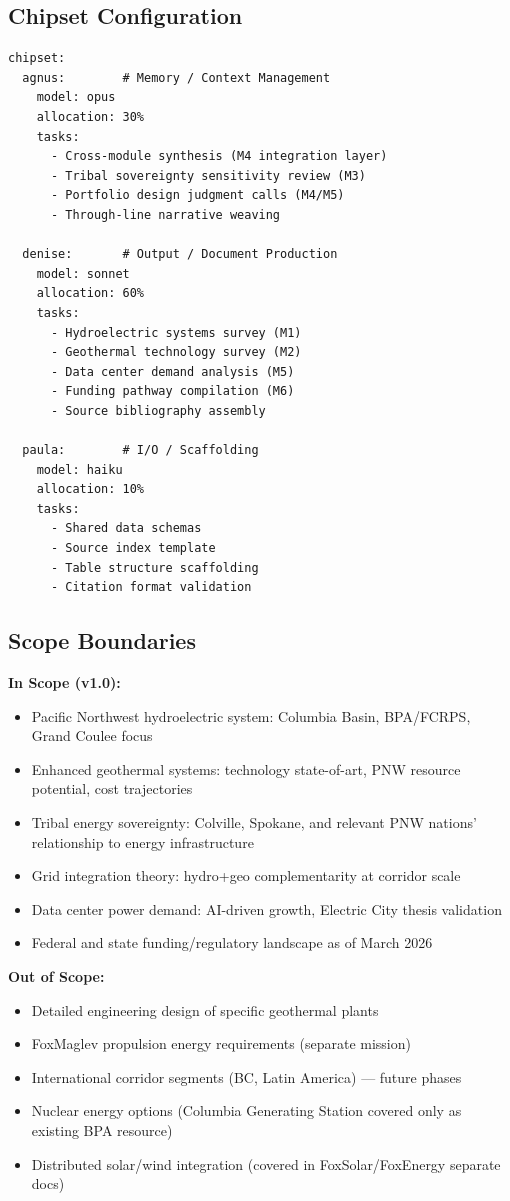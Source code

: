 \documentclass[11pt,letterpaper]{article}
\begin{document}
\subsection{Chipset Configuration}

\begin{asciibox}
\begin{verbatim}
chipset:
  agnus:        # Memory / Context Management
    model: opus
    allocation: 30%
    tasks:
      - Cross-module synthesis (M4 integration layer)
      - Tribal sovereignty sensitivity review (M3)
      - Portfolio design judgment calls (M4/M5)
      - Through-line narrative weaving

  denise:       # Output / Document Production
    model: sonnet
    allocation: 60%
    tasks:
      - Hydroelectric systems survey (M1)
      - Geothermal technology survey (M2)
      - Data center demand analysis (M5)
      - Funding pathway compilation (M6)
      - Source bibliography assembly

  paula:        # I/O / Scaffolding
    model: haiku
    allocation: 10%
    tasks:
      - Shared data schemas
      - Source index template
      - Table structure scaffolding
      - Citation format validation
\end{verbatim}
\end{asciibox}

\subsection{Scope Boundaries}

\textbf{In Scope (v1.0):}
\begin{itemize}[leftmargin=2em]
\item Pacific Northwest hydroelectric system: Columbia Basin, BPA/FCRPS, Grand Coulee focus
\item Enhanced geothermal systems: technology state-of-art, PNW resource potential, cost trajectories
\item Tribal energy sovereignty: Colville, Spokane, and relevant PNW nations' relationship to energy infrastructure
\item Grid integration theory: hydro+geo complementarity at corridor scale
\item Data center power demand: AI-driven growth, Electric City thesis validation
\item Federal and state funding/regulatory landscape as of March 2026
\end{itemize}

\textbf{Out of Scope:}
\begin{itemize}[leftmargin=2em]
\item Detailed engineering design of specific geothermal plants
\item FoxMaglev propulsion energy requirements (separate mission)
\item International corridor segments (BC, Latin America) --- future phases
\item Nuclear energy options (Columbia Generating Station covered only as existing BPA resource)
\item Distributed solar/wind integration (covered in FoxSolar/FoxEnergy separate docs)
\end{itemize}
\end{document}
